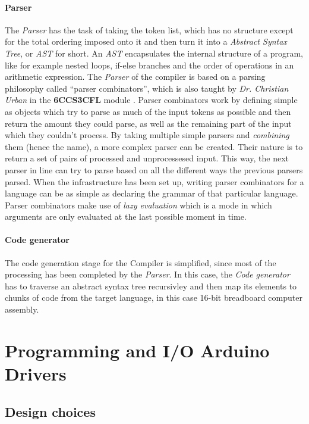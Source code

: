 \paragraph{Parser} The \emph{Parser} has the task of taking the token list, which has no structure except for the
total ordering imposed onto it and then turn it into a \emph{Abstract Syntax Tree}, or \emph{AST} for short. An
\emph{AST} encapsulates the internal structure of a program, like for example nested loops, if-else branches and the
order of operations in an arithmetic expression. The \emph{Parser} of the compiler is based on a parsing philosophy
called ``parser combinators'', which is also taught by \emph{Dr. Christian Urban} in the \textbf{6CCS3CFL} module
\cite{6ccs3cfl}. Parser combinators work by defining simple as objects which try to parse as much of the input tokens
as possible and then return the amount they could parse, as well as the remaining part of the input which they
couldn't process. By taking multiple simple parsers and \emph{combining} them (hence the name), a more complex parser
can be created. Their nature is to return a set of pairs of processed and unprocessesed input. This way,
the next parser in line can try to parse based on all the different ways the previous parsers parsed.
When the infrastructure has been set up, writing parser combinators for a language can be as simple as declaring
the grammar of that particular language. Parser combinators make use of \emph{lazy evaluation}
which is a mode in which arguments are only evaluated at the last possible moment in time.

\paragraph{Code generator}
The code generation stage for the Compiler is simplified, since most of the processing has been completed by the
\emph{Parser}. In this case, the \emph{Code generator} has to traverse an abstract syntax tree recursivley and then
map its elements to chunks of code from the target language, in this case 16-bit breadboard computer assembly.


\section{Programming and I/O Arduino Drivers}
\subsection{Design choices}

